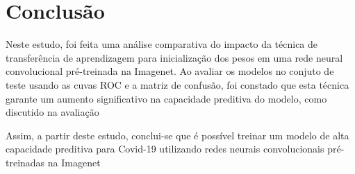 \documentclass[a4,12pt]{horizon-theme}
\begin{document}


\section{Conclusão}
Neste estudo, foi feita uma análise comparativa do impacto da técnica de transferência de aprendizagem para inicialização dos pesos em uma rede neural convolucional pré-treinada na Imagenet. Ao avaliar os modelos no conjuto de teste usando as cuvas ROC e a matriz de confusão, foi constado que esta técnica garante um aumento significativo na capacidade preditiva do modelo, como discutido na avaliação

Assim, a partir deste estudo, conclui-se que é possível treinar um modelo de alta capacidade preditiva para Covid-19 utilizando redes neurais convolucionais pré-treinadas na Imagenet


\printbibliography


\horizonBackCover
\end{document}
